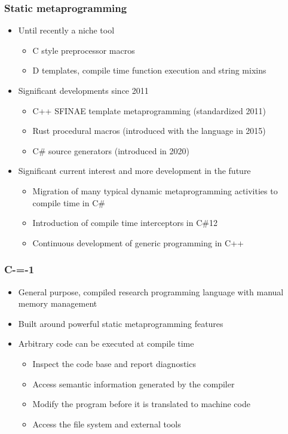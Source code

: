 \begin{frame}
	\frametitle{Static metaprogramming}

	\begin{itemize}
		\item Until recently a niche tool \begin{itemize}
			      \item C style preprocessor macros
			      \item D templates, compile time function execution and string mixins
		      \end{itemize}
		\item Significant developments since 2011\begin{itemize}
			      \item C++ SFINAE template metaprogramming (standardized 2011)
			      \item Rust procedural macros (introduced with the language in 2015)
			      \item C\# source generators (introduced in 2020)
		      \end{itemize}

		\item Significant current interest and more development in the future\begin{itemize}
			      \item Migration of many typical dynamic metaprogramming activities to compile time in C\#
			      \item Introduction of compile time interceptors in C\#12
			      \item Continuous development of generic programming in C++
		      \end{itemize}
	\end{itemize}

\end{frame}

\begin{frame}
	\frametitle{C-=-1}

	\begin{itemize}
		\item General purpose, compiled research programming language with manual memory management
		\item Built around powerful static metaprogramming features
		\item Arbitrary code can be executed at compile time\begin{itemize}
			\item Inspect the code base and report diagnostics
			\item Access semantic information generated by the compiler
			\item Modify the program before it is translated to machine code
			\item Access the file system and external tools
		\end{itemize}
	\end{itemize}

\end{frame}

